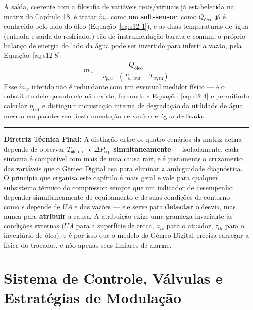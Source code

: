 \documentclass[12pt,a4paper]{article}
\numberwithin{equation}{section}
\numberwithin{table}{section}
\numberwithin{figure}{section}
\begin{document}
	A saída, coerente com a filosofia de variáveis reais/virtuais já estabelecida na matriz do Capítulo 18, é tratar $\dot{m}_w$ como um \textbf{soft-sensor}: como $\dot{Q}_{\text{óleo}}$ já é conhecido pelo lado do óleo (Equação~\eqref{eq:s12-1}), e as duas temperaturas de água (entrada e saída do resfriador) são de instrumentação barata e comum, o próprio balanço de energia do lado da água pode ser invertido para inferir a vazão, pela Equação~\eqref{eq:s12-8}:
	\begin{equation}\label{eq:s12-8}
 \dot{m}_w = \frac{\dot{Q}_{\text{óleo}}}{c_{p,w} \cdot (T_{w,\text{out}} - T_{w,\text{in}})}
\end{equation}
	Esse $\dot{m}_w$ inferido não é redundante com um eventual medidor físico — é o substituto dele quando ele não existe, fechando a Equação~\eqref{eq:s12-4} e permitindo calcular $\eta_{UA}$ e distinguir incrustação interna de degradação da utilidade de água mesmo em pacotes sem instrumentação de vazão de água dedicada.

	\vspace{1em}
	\hrule
	\vspace{1em}

	\textbf{Diretriz Técnica Final:} A distinção entre os quatro cenários da matriz acima depende de observar $T_{\text{óleo,ret}}$ e $\Delta P_{\text{sep}}$ \textbf{simultaneamente} — isoladamente, cada sintoma é compatível com mais de uma causa raiz, e é justamente o cruzamento das variáveis que o Gêmeo Digital usa para eliminar a ambiguidade diagnóstica. O princípio que organiza este capítulo é mais geral e vale para qualquer subsistema térmico do compressor: sempre que um indicador de desempenho depender simultaneamente do equipamento e de suas condições de contorno — como $\epsilon$ depende de $UA$ e das vazões — ele serve para \textbf{detectar} o desvio, mas nunca para \textbf{atribuir} a causa. A atribuição exige uma grandeza invariante às condições externas ($UA$ para a superfície de troca, $a_{tv}$ para o atuador, $\tau_{th}$ para o inventário de óleo), e é por isso que o modelo do Gêmeo Digital precisa carregar a física do trocador, e não apenas seus limiares de alarme.

	
	\clearpage
	\section{\textbf{Sistema de Controle, Válvulas e Estratégias de Modulação}}
\end{document}
